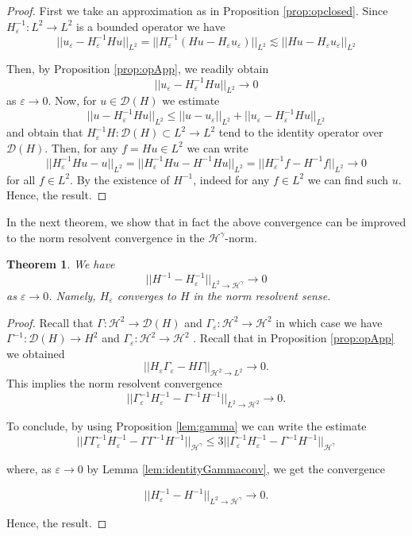 \documentclass[11pt, oneside]{article}   	%
\newtheorem{theorem}{Theorem}[section]
\begin{document}
	\begin{proof}
		First we take an approximation as in Proposition \ref{prop:opclosed}.  Since $H_\varepsilon^{-1} : L^2 \rightarrow L^2$ is a bounded operator we have
		\[
		||u_\varepsilon  - H_\varepsilon^{-1} Hu||_{L^2} = ||H_\varepsilon^{-1} (Hu - H_\varepsilon u_\varepsilon)||_{L^2} \lesssim ||Hu - H_\varepsilon u_\varepsilon||_{L^2}
		\]
		
		Then, by Proposition \ref{prop:opApp}, we readily obtain
		\[
		||u_\varepsilon  - H_\varepsilon^{-1} Hu||_{L^2} \rightarrow 0
		\]
		as $\varepsilon \rightarrow 0$.
		Now, for $u \in \mathscr{D}(H)$ we estimate
		\[
		||u - H_\varepsilon^{-1} Hu ||_{L^2} \leq||u - u_\varepsilon  ||_{L^2} + ||u_\varepsilon  - H_\varepsilon^{-1} Hu ||_{L^2}
		\]
		and obtain that $H_\varepsilon^{-1} H : \mathscr{D}(H) \subset L^2  \rightarrow L^2$ tend to the identity operator over $\mathscr{D}(H)$.  Then, for any $f = Hu \in L^2$ we can write 
		\[
		|| H_\varepsilon^{-1} Hu  - u||_{L^2} = || H_\varepsilon^{-1} Hu  - H^{-1}Hu||_{L^2}  = || H_\varepsilon^{-1} f  - H^{-1}f||_{L^2} \rightarrow 0
		\]
		for all $f \in L^2$.  By the existence of $H^{-1}$, indeed for any $f \in L^2$ we can find such $u$.   Hence, the result.
	\end{proof}

In the next theorem, we show that in fact the above convergence can be improved to the norm resolvent convergence in the $\mathscr{H}^\gamma$-norm.

	\begin{theorem} \label{thm:normResolventMain}
We have
	\[
	|| H^{-1}  - H_\varepsilon^{-1} ||_{L^2 \rightarrow \mathscr{H}^\gamma} \rightarrow 0
	\]
	as $\varepsilon \rightarrow 0$. Namely, $H_\varepsilon $ converges to $H$  in  the  norm resolvent sense.
\end{theorem}

\begin{proof}
		Recall that $\Gamma : \mathscr{H}^2 \rightarrow \mathscr{D}(H)$ and $\Gamma_\varepsilon : \mathscr{H}^2 \rightarrow \mathscr{H}^2$  in which case we have $\Gamma^{-1} : \mathscr{D}(H) \rightarrow H^2$ and $\Gamma_\varepsilon : \mathscr{H}^2 \rightarrow \mathscr{H}^2$ .
Recall that in Proposition \ref{prop:opApp} we obtained 
	\[
	|| H_\varepsilon \Gamma_\varepsilon- H\Gamma ||_{\mathscr{H}^2 \rightarrow L^2} \rightarrow 0.
	\]
	 This implies the   norm resolvent convergence  
	\[
	|| \Gamma_\varepsilon^{-1} H_\varepsilon^{-1}  - \Gamma^{-1}  H^{-1} ||_{L^2 \rightarrow \mathscr{H}^2}  \rightarrow 0.
	\]
	
	To conclude, by using Proposition \ref{lem:gamma} we can write the estimate
	\[
	|| \Gamma \Gamma_\varepsilon^{-1} H_\varepsilon^{-1} - \Gamma \Gamma^{-1}  H^{-1} ||_{\mathscr{H}^\gamma} \leq 3|| \Gamma_\varepsilon^{-1} H_\varepsilon^{-1} - \Gamma^{-1}  H^{-1} ||_{\mathscr{H}^\gamma}
	\]
	
	where, as $\varepsilon \rightarrow 0$ by Lemma \ref{lem:identityGammaconv}, we get the convergence
	
	\[
	||  H_\varepsilon^{-1}  - H^{-1} ||_{L^2 \rightarrow \mathscr{H}^\gamma} \rightarrow 0.
	\]
	
Hence, the result.
\end{proof}
\end{document}
